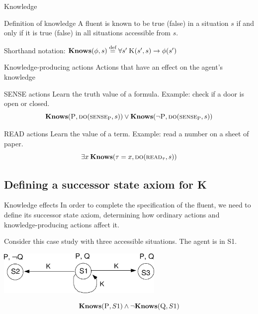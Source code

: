 \begin{frame}{Knowledge}
    \begin{block}{Definition of knowledge}
        A fluent is known to be true (false) in a situation \(s\)
        if and only if it is true (false)
        in all situations accessible from \(s\).
    \end{block}

    Shorthand notation: \( \textbf{Knows}(\phi, s) \stackrel{\text{def}}{=} \forall s' \: \textsc{K}(s',s) \rightarrow \phi(s') \)
\end{frame}

\begin{frame}{Knowledge-producing actions}
    Actions that have an effect on the agent's knowledge

    \begin{block}{SENSE actions}
        Learn the truth value of a formula. Example: check if a door is open or closed.
        \[
            \textbf{Knows}(\textsc{P}, \textsc{do}(\textsc{sense}_{\textsc{P}}, s))
            \lor
            \textbf{Knows}(\lnot \textsc{P}, \textsc{do}(\textsc{sense}_{\textsc{P}}, s))
        \]
    \end{block}

    \begin{block}{READ actions}
        Learn the value of a term. Example: read a number on a sheet of paper.
        \[
            \exists x \: \textbf{Knows}(\tau = x, \textsc{do}(\textsc{read}_\tau, s))
        \]
    \end{block}

\end{frame}

\subsection{Defining a successor state axiom for K}

\begin{frame}{Knowledge effects}
    In order to complete the specification of the \sck{} fluent,
    we need to define its successor state axiom,
    determining how ordinary actions and knowledge-producing actions affect it.

    Consider this case study with three accessible situations. The agent is in S1.

    \begin{center}
        \includegraphics[width=0.6\textwidth]{assets/3states_noactions.png}
    \end{center}

    \[ \textbf{Knows}(\textsc{P}, S1) \land \lnot \textbf{Knows}(\textsc{Q}, S1) \]
\end{frame}

